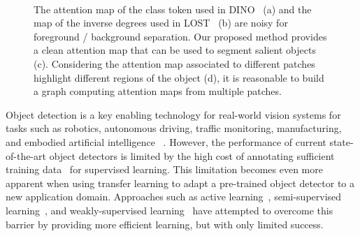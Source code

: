 \documentclass[twocolumn]{article}
\begin{document}
\begin{figure}[!t]
  \centering
  \begin{minipage}[b]{.32\columnwidth}
  \end{minipage}
  \hfill
  \begin{minipage}[b]{.32\columnwidth}
  \end{minipage}
  \hfill
  \begin{minipage}[b]{.32\columnwidth}
  \end{minipage}
  \\
  \begin{minipage}[b]{\columnwidth}
  \end{minipage}
  \caption{The attention map of the class token used in DINO~\cite{caron2021emerging} (a) and the map of the inverse degrees used in LOST~\cite{simeoni2021localizing} (b) are noisy for foreground / background separation. Our proposed method provides a clean attention map that  can be used to segment salient objects (c). Considering the attention map associated to different patches highlight different regions of the object (d), it is reasonable to build a graph computing attention maps from multiple patches.}
  \label{fig:teaser}\end{figure}


Object detection is a key enabling technology for real-world vision systems for tasks such as robotics, autonomous driving, traffic monitoring, manufacturing, and embodied artificial intelligence ~\cite{wu2017squeezedet,geiger2013vision,xia2018dota}. However, the performance of current state-of-the-art object detectors is limited by the high cost of annotating sufficient training data~\cite{lin2014microsoft} for supervised learning. This limitation becomes even more apparent when using transfer learning to adapt a pre-trained object detector to a new application domain. Approaches such as active learning~\cite{aghdam2019active}, semi-supervised learning~\cite{liu2021unbiased}, and weakly-supervised learning~\cite{ren2020instance} have attempted to overcome this barrier by providing more efficient learning, but with only limited success. 
\end{document}

